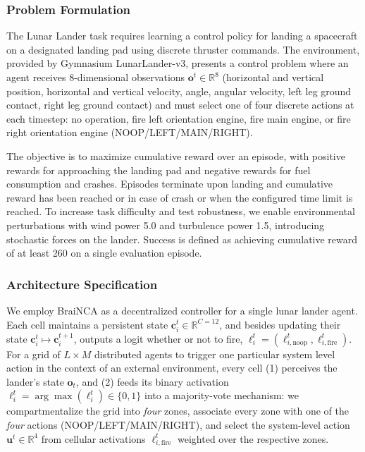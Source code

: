 \documentclass[letterpaper]{article}
\newcommand{\bh}[1]{{\color{black}#1}}  %
\begin{document}
\subsubsection{Problem Formulation}

The Lunar Lander task requires learning a control policy for landing a spacecraft on a designated landing pad using discrete thruster commands. The environment, provided by Gymnasium LunarLander-v3, presents a  control problem where an agent receives 8-dimensional observations \bh{$\mathbf{o}^t\in\mathbb{R}^8$} (horizontal and vertical position, horizontal and vertical velocity, angle, angular velocity, left leg ground contact, right leg ground contact) and must select one of four discrete actions at each timestep: no operation, fire left orientation engine, fire main engine, or fire right orientation engine (NOOP/LEFT/MAIN/RIGHT).

The objective is to maximize cumulative reward over an episode, with positive rewards for approaching the landing pad and negative rewards for fuel consumption and crashes. Episodes terminate upon landing and cumulative reward has been reached or in case of crash or when the configured time limit is reached. To increase task difficulty and test robustness, we enable environmental perturbations with wind power 5.0 and turbulence power 1.5, introducing stochastic forces on the lander. Success is defined as achieving cumulative reward of at least 260 on a single evaluation episode.



\subsubsection{Architecture Specification}
\bh{We employ BraiNCA as a decentralized controller for a single lunar lander agent.}
Each cell maintains a persistent state 
\bh{$\mathbf{c}_i^t \in \mathbb{R}^{C=12}$, and}
\bh{besides updating their state $\mathbf{c}_i^t\mapsto \mathbf{c}_i^{t+1}$, outputs a logit whether or not to fire, ${\boldsymbol{\ell}}_i^t=(\ell_{i,\text{noop}}^t,\ell_{i,\text{fire}}^t)$.
For a grid of $L\times M$ distributed agents to trigger one particular system level action in the context of an external environment, every cell (1) perceives the lander's state $\mathbf{o}_t$, and (2) feeds its binary activation $\ell_i^t=\arg\max(\boldsymbol{\ell}_i^t)\in\{0, 1\}$ into a majority-vote mechanism:
we compartmentalize the grid into \textit{four} zones, associate every zone with one of the \textit{four} actions (NOOP/LEFT/MAIN/RIGHT), and select the system-level action $\mathbf{u}^t\in\mathbb{R}^4$ from cellular activations $\ell_{i,\text{fire}}^t$ weighted over the respective zones.}
\end{document}

